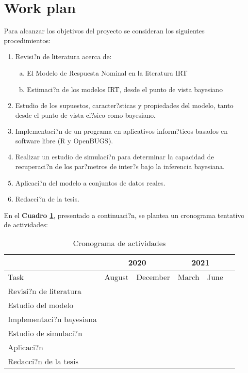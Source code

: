 \section{Work plan}

Para alcanzar los objetivos del proyecto se consideran los siguientes procedimientos:
\begin{enumerate}
	\item Revisi?n de literatura acerca de:
	\begin{enumerate}[(a)]
		\item El Modelo de Respuesta Nominal en la literatura IRT
 		\item Estimaci?n de los modelos IRT, desde el punto de vista bayesiano
	\end{enumerate}

	\item Estudio de los supuestos, caracter?sticas y propiedades del modelo, tanto desde el punto de vista cl?sico como bayesiano.
	\item Implementaci?n de un programa en aplicativos inform?ticos basados en software libre (R y OpenBUGS).
	\item Realizar un estudio de simulaci?n para determinar la capacidad de recuperaci?n de los par?metros de inter?s bajo la inferencia bayesiana.
	\item Aplicaci?n del modelo a conjuntos de datos reales.
	\item Redacci?n de la tesis.
\end{enumerate}

En el \textbf{Cuadro \ref{tabla1}}, presentado a continuaci?n, se plantea un cronograma tentativo de actividades:

\newcommand{\X}{\textbullet} 			%

\begin{table}[h]
  \centering
  \begin{tabular}{|l||c|c|c|c|c|}
    \hline
                            & \multicolumn{2}{|c|}{2020}  & \multicolumn{2}{|c|}{2021} \\
    \hline
    \hline
    Task                    & August  & December          & March   & June  \\
    \hline
    Revisi?n de literatura  & \X      & \X                & \X      & \X  	\\
    Estudio del modelo      & \X      & \X                & \X      & \X  	\\    
    Implementaci?n bayesiana& \X      & \X                & \X      & \X  	\\
    Estudio de simulaci?n   & \X      & \X                & \X      & \X  	\\
    Aplicaci?n              & \X      & \X                & \X      & \X  	\\
    Redacci?n de la tesis   & \X      & \X                & \X      & \X  	\\
    \hline
    \hline
  \end{tabular}
  \caption{Cronograma de actividades}
  \label{tabla1}
\end{table}